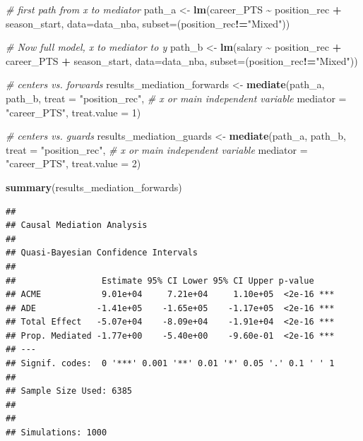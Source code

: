 \documentclass[
]{book}
\newenvironment{Shaded}{\begin{snugshade}}{\end{snugshade}}
\newcommand{\AttributeTok}[1]{\textcolor[rgb]{0.13,0.29,0.53}{#1}}
\newcommand{\CommentTok}[1]{\textcolor[rgb]{0.56,0.35,0.01}{\textit{#1}}}
\newcommand{\DecValTok}[1]{\textcolor[rgb]{0.00,0.00,0.81}{#1}}
\newcommand{\FunctionTok}[1]{\textcolor[rgb]{0.13,0.29,0.53}{\textbf{#1}}}
\newcommand{\NormalTok}[1]{#1}
\newcommand{\OtherTok}[1]{\textcolor[rgb]{0.56,0.35,0.01}{#1}}
\newcommand{\SpecialCharTok}[1]{\textcolor[rgb]{0.81,0.36,0.00}{\textbf{#1}}}
\newcommand{\StringTok}[1]{\textcolor[rgb]{0.31,0.60,0.02}{#1}}
\begin{document}
\begin{Shaded}
\begin{Highlighting}[]
\CommentTok{\# first path from x to mediator}
\NormalTok{path\_a }\OtherTok{\textless{}{-}} \FunctionTok{lm}\NormalTok{(career\_PTS }\SpecialCharTok{\textasciitilde{}}\NormalTok{ position\_rec }\SpecialCharTok{+}\NormalTok{ season\_start, }\AttributeTok{data=}\NormalTok{data\_nba, }\AttributeTok{subset=}\NormalTok{(position\_rec}\SpecialCharTok{!=}\StringTok{"Mixed"}\NormalTok{))}

\CommentTok{\# Now full model, x to mediator to y}
\NormalTok{path\_b }\OtherTok{\textless{}{-}} \FunctionTok{lm}\NormalTok{(salary }\SpecialCharTok{\textasciitilde{}}\NormalTok{ position\_rec }\SpecialCharTok{+}\NormalTok{ career\_PTS }\SpecialCharTok{+}\NormalTok{ season\_start, }\AttributeTok{data=}\NormalTok{data\_nba, }\AttributeTok{subset=}\NormalTok{(position\_rec}\SpecialCharTok{!=}\StringTok{"Mixed"}\NormalTok{))}

\CommentTok{\# centers vs. forwards}
\NormalTok{results\_mediation\_forwards }\OtherTok{\textless{}{-}} \FunctionTok{mediate}\NormalTok{(path\_a, path\_b,}
                             \AttributeTok{treat =} \StringTok{"position\_rec"}\NormalTok{, }\CommentTok{\# x or main independent variable}
                             \AttributeTok{mediator =} \StringTok{"career\_PTS"}\NormalTok{,}
                             \AttributeTok{treat.value =} \DecValTok{1}\NormalTok{)}

\CommentTok{\# centers vs. guards}
\NormalTok{results\_mediation\_guards }\OtherTok{\textless{}{-}} \FunctionTok{mediate}\NormalTok{(path\_a, path\_b,}
                             \AttributeTok{treat =} \StringTok{"position\_rec"}\NormalTok{, }\CommentTok{\# x or main independent variable}
                             \AttributeTok{mediator =} \StringTok{"career\_PTS"}\NormalTok{,}
                             \AttributeTok{treat.value =} \DecValTok{2}\NormalTok{)}

\FunctionTok{summary}\NormalTok{(results\_mediation\_forwards)}
\end{Highlighting}
\end{Shaded}

\begin{verbatim}
## 
## Causal Mediation Analysis 
## 
## Quasi-Bayesian Confidence Intervals
## 
##                 Estimate 95% CI Lower 95% CI Upper p-value    
## ACME            9.01e+04     7.21e+04     1.10e+05  <2e-16 ***
## ADE            -1.41e+05    -1.65e+05    -1.17e+05  <2e-16 ***
## Total Effect   -5.07e+04    -8.09e+04    -1.91e+04  <2e-16 ***
## Prop. Mediated -1.77e+00    -5.40e+00    -9.60e-01  <2e-16 ***
## ---
## Signif. codes:  0 '***' 0.001 '**' 0.01 '*' 0.05 '.' 0.1 ' ' 1
## 
## Sample Size Used: 6385 
## 
## 
## Simulations: 1000
\end{verbatim}
\end{document}

